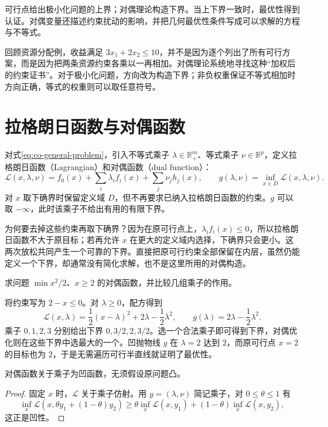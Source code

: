 \documentclass[UTF8,12pt,a4paper,fontset=fandol]{ctexbook}
\begin{document}
可行点给出极小化问题的上界；对偶理论构造下界。当上下界一致时，最优性得到认证。对偶变量还描述约束扰动的影响，并把几何最优性条件写成可以求解的方程与不等式。

回顾资源分配例，收益满足 $3x_1+2x_2\leq10$，并不是因为逐个列出了所有可行方案，而是因为把两条资源约束各乘以一再相加。对偶理论系统地寻找这种“加权后的约束证书”。对于极小化问题，方向改为构造下界；非负权重保证不等式相加时方向正确，等式的权重则可以取任意符号。

\section{拉格朗日函数与对偶函数}

对式\eqref{eq:co-general-problem}，引入不等式乘子 $\lambda\in\mathbb R_+^m$、等式乘子 $\nu\in\mathbb R^p$，定义拉格朗日函数（Lagrangian）和对偶函数（dual function）：
\begin{equation}
 \mathcal L(x,\lambda,\nu)=f_0(x)+\sum_i\lambda_i f_i(x)+\sum_j\nu_j h_j(x),
 \qquad g(\lambda,\nu)=\inf_{x\in D}\mathcal L(x,\lambda,\nu).
 \label{eq:co-lagrangian-dual-function}
\end{equation}
对 $x$ 取下确界时保留定义域 $D$，但不再要求已纳入拉格朗日函数的约束。$g$ 可以取 $-\infty$，此时该乘子不给出有用的有限下界。

为何要去掉这些约束再取下确界？因为在原可行点上，$\lambda_i f_i(x)\leq0$，所以拉格朗日函数不大于原目标；若再允许 $x$ 在更大的定义域内选择，下确界只会更小。这两次放松共同产生一个可靠的下界。直接把原可行约束全部保留在内层，虽然仍能定义一个下界，却通常没有简化求解，也不是这里所用的对偶构造。

\begin{example}[一个可以画出全部下界的对偶]
求问题 $\min x^2/2$、$x\geq2$ 的对偶函数，并比较几组乘子的作用。
\end{example}
\begin{solve}
将约束写为 $2-x\leq0$。对 $\lambda\geq0$，配方得到
\[
 \mathcal L(x,\lambda)=\frac12(x-\lambda)^2
                  +2\lambda-\frac12\lambda^2,\qquad
 g(\lambda)=2\lambda-\frac12\lambda^2.
\]
乘子 $0,1,2,3$ 分别给出下界 $0,3/2,2,3/2$。选一个合法乘子即可得到下界，对偶优化则在这些下界中选最大的一个。凹抛物线 $g$ 在 $\lambda=2$ 达到 $2$，而原可行点 $x=2$ 的目标也为 $2$，于是无需遍历可行半直线就证明了最优性。
\end{solve}

\begin{proposition}
对偶函数关于乘子为凹函数，无须假设原问题凸。
\end{proposition}
\begin{proof}
固定 $x$ 时，$\mathcal L$ 关于乘子仿射。用 $y=(\lambda,\nu)$ 简记乘子，对 $0\leq\theta\leq1$ 有
\[
 \inf_x\mathcal L(x,\theta y_1+(1-\theta)y_2)
 \geq\theta\inf_x\mathcal L(x,y_1)+(1-\theta)\inf_x\mathcal L(x,y_2),
\]
这正是凹性。
\end{proof}
\end{document}
